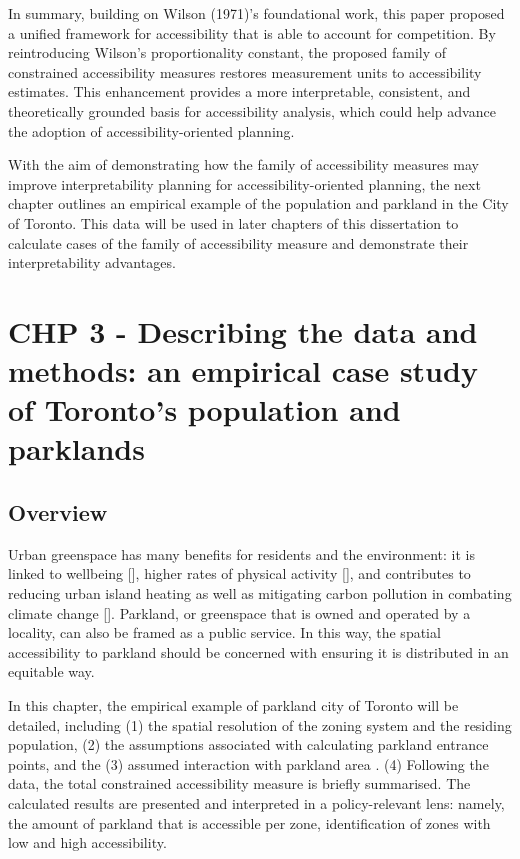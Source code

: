 \documentclass[
11pt, %
oneside, %
english, %
singlespacing, %
]{macthesis} %
\begin{document}
In summary, building on Wilson (1971)'s foundational work, this paper proposed a unified framework for accessibility that is able to account for competition. By reintroducing Wilson's proportionality constant, the proposed family of constrained accessibility measures restores measurement units to accessibility estimates. This enhancement provides a more interpretable, consistent, and theoretically grounded basis for accessibility analysis, which could help advance the adoption of accessibility-oriented planning.

With the aim of demonstrating how the family of accessibility measures may improve interpretability planning for accessibility-oriented planning, the next chapter outlines an empirical example of the population and parkland in the City of Toronto. This data will be used in later chapters of this dissertation to calculate cases of the family of accessibility measure and demonstrate their interpretability advantages.

\chapter{CHP 3 - Describing the data and methods: an empirical case study of Toronto's population and parklands}\label{chp-3---describing-the-data-and-methods-an-empirical-case-study-of-torontos-population-and-parklands}

\section{Overview}\label{overview-2}

Urban greenspace has many benefits for residents and the environment: it is linked to wellbeing {[}{]}, higher rates of physical activity {[}{]}, and contributes to reducing urban island heating as well as mitigating carbon pollution in combating climate change {[}{]}. Parkland, or greenspace that is owned and operated by a locality, can also be framed as a public service. In this way, the spatial accessibility to parkland should be concerned with ensuring it is distributed in an equitable way.

In this chapter, the empirical example of parkland city of Toronto will be detailed, including (1) the spatial resolution of the zoning system and the residing population, (2) the assumptions associated with calculating parkland entrance points, and the (3) assumed interaction with parkland area . (4) Following the data, the total constrained accessibility measure is briefly summarised. The calculated results are presented and interpreted in a policy-relevant lens: namely, the amount of parkland that is accessible per zone, identification of zones with low and high accessibility.
\end{document}
